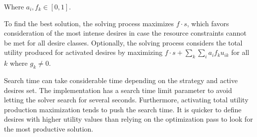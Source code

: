 \documentclass[12pt]{article}
\begin{document}
Where $a_i, f_k \in [0,1]$.

To find the best solution, the solving process maximizes $f \cdot s$, which 
favors consideration of the most intense desires in case the resource 
constraints cannot be met for all desire classes.
Optionally, the solving process considers the total utility produced for
activated desires by maximizing 
$f \cdot s + \sum\limits_k\sum\limits_i a_i f_k u_{ik}$ 
for all $k$ where $g_k \neq 0$.


Search time can take considerable time depending on the strategy and active
desires set.
The implementation has a search time limit parameter to avoid letting the solver
search for several seconds.
Furthermore, activating total utility production maximization tends to push the
search time.
It is quicker to define desires with higher utility values than relying on the
optimization pass to look for the most productive solution.
\end{document}
